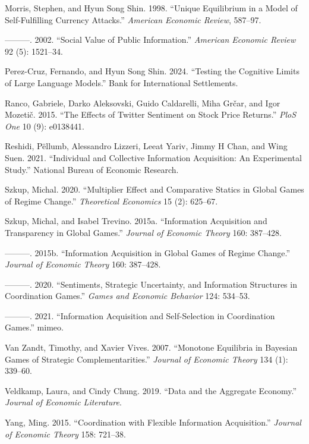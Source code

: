 \documentclass[
]{article}
\newlength{\cslhangindent}
\newlength{\cslentryspacingunit} %
\newenvironment{CSLReferences}[2] %
 {%
  \setlength{\parindent}{0pt}
  \ifodd #1
  \let\oldpar\par
  \def\par{\hangindent=\cslhangindent\oldpar}
  \fi
  \setlength{\parskip}{#2\cslentryspacingunit}
 }%
 {}
\theoremstyle{plain}
\theoremstyle{remark}
\begin{document}
\begin{CSLReferences}{1}{0}
\leavevmode{}%
Morris, Stephen, and Hyun Song Shin. 1998. {``Unique Equilibrium in a
Model of Self-Fulfilling Currency Attacks.''} \emph{American Economic
Review}, 587--97.

\leavevmode{}%
---------. 2002. {``Social Value of Public Information.''}
\emph{American Economic Review} 92 (5): 1521--34.

\leavevmode{}%
Perez-Cruz, Fernando, and Hyun Song Shin. 2024. {``Testing the Cognitive
Limits of Large Language Models.''} Bank for International Settlements.

\leavevmode{}%
Ranco, Gabriele, Darko Aleksovski, Guido Caldarelli, Miha Grčar, and
Igor Mozetič. 2015. {``The Effects of Twitter Sentiment on Stock Price
Returns.''} \emph{PloS One} 10 (9): e0138441.

\leavevmode{}%
Reshidi, Pëllumb, Alessandro Lizzeri, Leeat Yariv, Jimmy H Chan, and
Wing Suen. 2021. {``Individual and Collective Information Acquisition:
An Experimental Study.''} National Bureau of Economic Research.

\leavevmode{}%
Szkup, Michal. 2020. {``Multiplier Effect and Comparative Statics in
Global Games of Regime Change.''} \emph{Theoretical Economics} 15 (2):
625--67.

\leavevmode{}%
Szkup, Michal, and Isabel Trevino. 2015a. {``Information Acquisition and
Transparency in Global Games.''} \emph{Journal of Economic Theory} 160:
387--428.

\leavevmode{}%
---------. 2015b. {``Information Acquisition in Global Games of Regime
Change.''} \emph{Journal of Economic Theory} 160: 387--428.

\leavevmode{}%
---------. 2020. {``Sentiments, Strategic Uncertainty, and Information
Structures in Coordination Games.''} \emph{Games and Economic Behavior}
124: 534--53.

\leavevmode{}%
---------. 2021. {``Information Acquisition and Self-Selection in
Coordination Games.''} mimeo.

\leavevmode{}%
Van Zandt, Timothy, and Xavier Vives. 2007. {``Monotone Equilibria in
Bayesian Games of Strategic Complementarities.''} \emph{Journal of
Economic Theory} 134 (1): 339--60.

\leavevmode{}%
Veldkamp, Laura, and Cindy Chung. 2019. {``Data and the Aggregate
Economy.''} \emph{Journal of Economic Literature}.

\leavevmode{}%
Yang, Ming. 2015. {``Coordination with Flexible Information
Acquisition.''} \emph{Journal of Economic Theory} 158: 721--38.

\end{CSLReferences}
\end{document}
